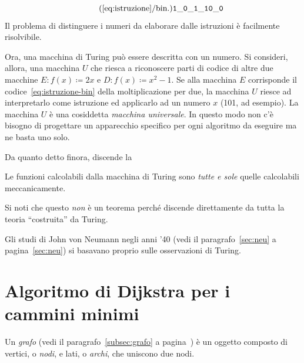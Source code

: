 \begin{equation}\label{eq:istruzione-bin}\tag{\ref*{eq:istruzione}/bin.}
\mathtt{1\_0\_1\_10\_0}%
\end{equation}
Il problema di distinguere i numeri da elaborare dalle istruzioni è facilmente risolvibile.

Ora, una macchina di Turing può essere descritta con un numero.
Si consideri, allora, una macchina $U$ che riesca a riconoscere parti di codice di altre due macchine $E\colon f(x)\coloneqq2x$ e $D\colon f(x)\coloneqq x^2-1$.
Se alla macchina $E$ corrisponde il codice~\eqref{eq:istruzione-bin} della moltiplicazione per due, la macchina $U$ riesce ad interpretarlo come istruzione ed applicarlo ad un numero $x$ (\num[parse-numbers=false]{101}, ad esempio).
La macchina $U$ è una cosiddetta \emph{macchina universale}.
In questo modo non c'è bisogno di progettare un apparecchio specifico per ogni algoritmo da eseguire ma ne basta uno solo.


Da  quanto detto finora, discende la
\begin{thesis*}
Le funzioni calcolabili dalla macchina di Turing sono \emph{tutte e sole} quelle calcolabili meccanicamente.
\end{thesis*}
Si noti che questo \emph{non} è un teorema perché discende direttamente da tutta la teoria ``costruita'' da Turing.


Gli studi di John von Neumann negli anni '40 (vedi il paragrafo~\ref{sec:neu} a pagina~\ref{sec:neu}) si basavano proprio sulle osservazioni di Turing.


	\section{Algoritmo di Dijkstra per i cammini minimi}

Un \emph{grafo} (vedi il paragrafo~\ref{subsec:grafo} a pagina~\pageref{subsec:grafo}) è un oggetto composto di vertici, o \emph{nodi}, e lati, o \emph{archi}, che uniscono due nodi.


